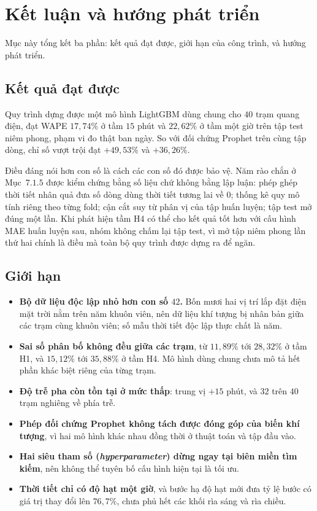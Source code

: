 \documentclass[12pt, a4paper]{report}
\begin{document}
\FloatBarrier
\section{Kết luận và hướng phát triển}

Mục này tổng kết ba phần: kết quả đạt được, giới hạn của công trình, và hướng phát triển.

\FloatBarrier
\subsection{Kết quả đạt được}

Quy trình dựng được một mô hình LightGBM dùng chung cho $40$ trạm quang điện, đạt WAPE
$17{,}74\%$ ở tầm $15$ phút và $22{,}62\%$ ở tầm một giờ trên tập test niêm phong, phạm vi đo
thật ban ngày. So với đối chứng Prophet trên cùng tập dòng, chỉ số vượt trội đạt $+49{,}53\%$
và $+36{,}26\%$.

Điều đáng nói hơn con số là cách các con số đó được bảo vệ. Năm rào chắn ở Mục~$7.1.5$ được kiểm
chứng bằng số liệu chứ không bằng lập luận: phép ghép thời tiết nhân quả đưa số dòng dùng thời
tiết tương lai về $0$; thống kê quy mô tính riêng theo từng fold; cận cắt suy từ phân vị của
tập huấn luyện; tập test mở đúng một lần. Khi phát hiện tầm H4 có thể cho kết quả tốt hơn với
cấu hình MAE huấn luyện sau, nhóm không chấm lại tập test, vì mở tập niêm phong lần thứ hai
chính là điều mà toàn bộ quy trình được dựng ra để ngăn.

\FloatBarrier
\subsection{Giới hạn}

\begin{itemize}
    \item \textbf{Bộ dữ liệu độc lập nhỏ hơn con số $42$.} Bốn mươi hai vị trí lắp đặt điện mặt trời nằm trên
    năm khuôn viên, nên dữ liệu khí tượng bị nhân bản giữa các trạm cùng khuôn viên; số mẫu
    thời tiết độc lập thực chất là năm.
    \item \textbf{Sai số phân bố không đều giữa các trạm}, từ $11{,}89\%$ tới $28{,}32\%$ ở
    tầm H1, và $15{,}12\%$ tới $35{,}88\%$ ở tầm H4. Mô hình dùng chung chưa mô tả hết phần khác
    biệt riêng của từng trạm.
    \item \textbf{Độ trễ pha còn tồn tại ở mức thấp}: trung vị $+15$ phút, và $32$ trên $40$
    trạm nghiêng về phía trễ.
    \item \textbf{Phép đối chứng Prophet không tách được đóng góp của biến khí tượng}, vì hai
    mô hình khác nhau đồng thời ở thuật toán và tập đầu vào.
    \item \textbf{Hai siêu tham số (\textit{hyperparameter}) dừng ngay tại biên miền tìm kiếm}, nên không thể tuyên bố
    cấu hình hiện tại là tối ưu.
    \item \textbf{Thời tiết chỉ có độ hạt một giờ}, và bước hạ độ hạt mới đưa tỷ lệ
    bước có giá trị thay đổi lên $76{,}7\%$, chưa phủ hết các khối rìa sáng và rìa chiều.
\end{itemize}
\end{document}
